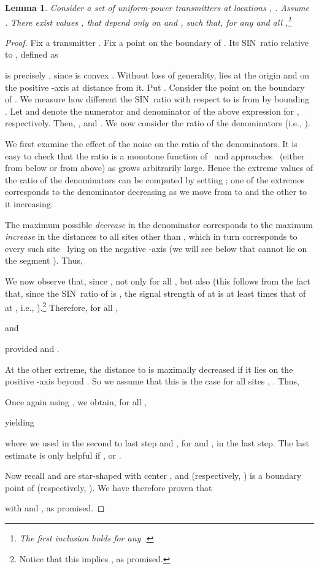 \documentclass[11pt]{article}
\newtheorem{lemma}[theorem]{Lemma}
\theoremstyle{remark}
\begin{document}
\begin{lemma}
  \label{lem:tedious}
  Consider a set of  uniform-power transmitters at locations , . 
  Assume . There exist values , that depend only on  and , such that, for any  and all ,\footnote{The first inclusion holds for any .}
  
\end{lemma}
\begin{proof}
  Fix a transmitter .  Fix a point  on the boundary of .  Its SIN~ratio  relative to , defined as
  
  is precisely , since  is convex
  \cite{aeklpr-sdciawn-12}.  Without loss of generality,  lies at
  the origin and  on the positive -axis at distance  from it.
  Put .  Consider the point  on the boundary
  of .  We measure how different the SIN~ratio  with respect to  is
  from  by bounding .  Let  and  denote the numerator and denominator of the above expression for , respectively.
  Then, , and
  . 
  We now consider the ratio of the denominators (i.e., ).

  We first examine the effect of the noise  on the ratio of the denominators.  It is easy to check that the ratio is a monotone function of~ and approaches~ (either from below or from above) as  grows arbitrarily large.  Hence the extreme values of the ratio of the denominators can be computed by setting ; one of the extremes corresponds to the denominator decreasing as we move from  to  and the other to it increasing.

  The maximum possible \emph{decrease} in the denominator
  corresponds to the maximum \emph{increase} in the distances to all
  sites other than , which in turn corresponds to every such
  site~ lying on the negative -axis (we will see below that 
  cannot lie on the segment ).  Thus,
  
  We now observe that, since , not only
   for all , but also
   (this follows from the fact that, since the SIN~ratio of  is , the signal strength of  at  is at least  times that of  at , i.e., ).\footnote{
    Notice that this implies , as promised.}
  Therefore, for all ,
  
  and
  
  provided  and .
   
  At the other extreme, the distance to  is maximally decreased if it lies on the positive -axis beyond .  So we assume that this is the case for all sites , . Thus,
  
Once again using , we obtain, for all ,
  
  yielding
  
  where we used  in the second to last step and , for  and , in the last step.  The last estimate is only helpful if , or .

  Now recall  and  are star-shaped with center , and  (respectively, ) is a boundary point of  (respectively, ).  We have therefore proven that 
  
  with  and , as promised.
\end{proof}
\end{document}
